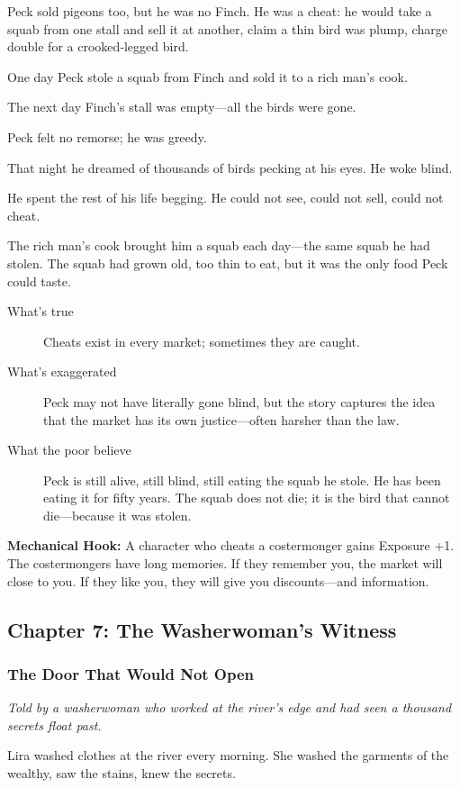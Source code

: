 \documentclass[11pt]{article}
\begin{document}
Peck sold pigeons too, but he was no Finch. He was a cheat: he would take a squab from one stall and sell it at another, claim a thin bird was plump, charge double for a crooked‑legged bird.

One day Peck stole a squab from Finch and sold it to a rich man's cook.

The next day Finch’s stall was empty—all the birds were gone.

Peck felt no remorse; he was greedy.

That night he dreamed of thousands of birds pecking at his eyes. He woke blind.

He spent the rest of his life begging. He could not see, could not sell, could not cheat.

The rich man’s cook brought him a squab each day—the same squab he had stolen. The squab had grown old, too thin to eat, but it was the only food Peck could taste.

\begin{description}
\item[What's true] Cheats exist in every market; sometimes they are caught.
\item[What's exaggerated] Peck may not have literally gone blind, but the story captures the idea that the market has its own justice—often harsher than the law.
\item[What the poor believe] Peck is still alive, still blind, still eating the squab he stole. He has been eating it for fifty years. The squab does not die; it is the bird that cannot die—because it was stolen.
\end{description}

\textbf{Mechanical Hook:} A character who cheats a costermonger gains Exposure +1. The costermongers have long memories. If they remember you, the market will close to you. If they like you, they will give you discounts—and information.

\subsection{Chapter 7: The Washerwoman's Witness}
\subsubsection{The Door That Would Not Open}
\textit{Told by a washerwoman who worked at the river's edge and had seen a thousand secrets float past.}

Lira washed clothes at the river every morning. She washed the garments of the wealthy, saw the stains, knew the secrets.
\end{document}
